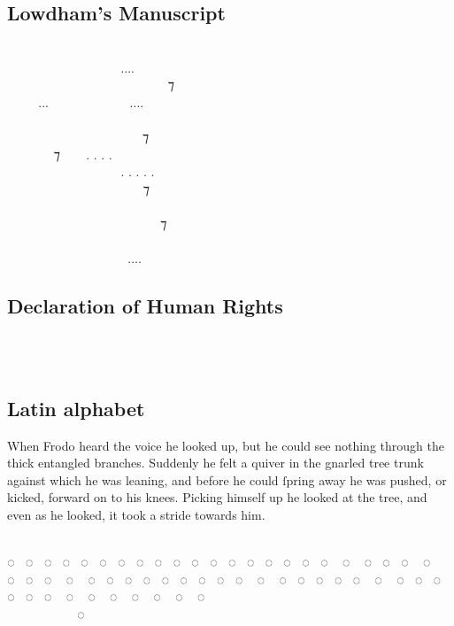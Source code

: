 \documentclass[11pt,a4paper]{article}
\begin{document}
\subsection*{Lowdham’s Manuscript}
\freemonotengwar
  ‍   ‍  ‍  \\
    ‍....  ‍  \\
  ‍   ‍ ‍ ⁊ ‍  \\
...  ....   \\
         ‍ \\
 ‍ ‍‍   ⁊  ‍ ‍ \\
 ‍ ⁊  . . . .  ‍ ‍‍   \\
   ‍ . . . . . ‍ ‍   \\
      ⁊    \\
   ‍‍   ‍  \\
     ‍ ⁊  ‍ \\
        \\
  ‍  .... ‍‍    \\

\subsection*{Declaration of Human Rights}
\freemonotengwar
\begin{center}
                              
\end{center}

\subsection*{Latin alphabet}
\freemonotengwar
When Frodo heard the voice he looked up, but he could
see nothing through the thick entangled branches.
Suddenly he felt a quiver in the gnarled tree trunk
against which he was leaning, and before he could
ſpring away he was pushed, or kicked, forward on to
his knees. Picking himself up he looked at the tree,
and even as he looked, it took a stride towards him.

\newpage

\freemonotengwar
                          \\
◌ ◌ ◌ ◌ ◌ ◌ ◌ ◌ ◌ ◌ ◌ ◌ ◌ ◌ ◌ ◌ ◌ ◌ ◌ ◌ ◌ ◌ ◌ ◌ ◌ ◌ ◌ ◌ ◌ ◌ ◌ ◌ ◌ ◌ ◌ ◌ ◌ ◌ ◌ ◌ ◌ ◌ ◌ ◌ ◌ ◌ ◌ ◌ ◌ ◌ ◌ ◌ ◌ ◌ ◌ ◌\\
      ◌‍ 
\end{document}
